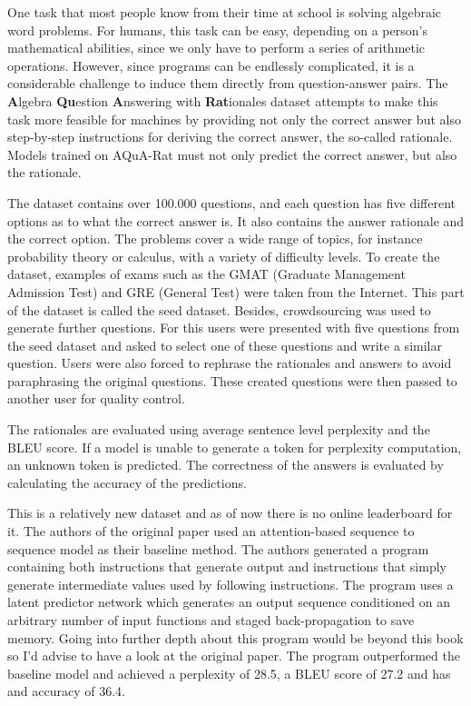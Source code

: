 \documentclass[]{krantz}
\begin{document}
One task that most people know from their time at school is solving algebraic word problems. For humans, this task can be easy, depending on a person's mathematical abilities, since we only have to perform a series of arithmetic operations. However, since programs can be endlessly complicated, it is a considerable challenge to induce them directly from question-answer pairs. The \textbf{A}lgebra \textbf{Qu}estion \textbf{A}nswering with \textbf{Rat}ionales dataset attempts to make this task more feasible for machines by providing not only the correct answer but also step-by-step instructions for deriving the correct answer, the so-called rationale. Models trained on AQuA-Rat must not only predict the correct answer, but also the rationale.

The dataset contains over 100.000 questions, and each question has five different options as to what the correct answer is. It also contains the answer rationale and the correct option. The problems cover a wide range of topics, for instance probability theory or calculus, with a variety of difficulty levels. To create the dataset, examples of exams such as the GMAT (Graduate Management Admission Test) and GRE (General Test) were taken from the Internet. This part of the dataset is called the seed dataset.
Besides, crowdsourcing was used to generate further questions. For this users were presented with five questions from the seed dataset and asked to select one of these questions and write a similar question. Users were also forced to rephrase the rationales and answers to avoid paraphrasing the original questions.
These created questions were then passed to another user for quality control.

The rationales are evaluated using average sentence level perplexity and the BLEU score. If a model is unable to generate a token for perplexity computation, an unknown token is predicted. The correctness of the answers is evaluated by calculating the accuracy of the predictions.

This is a relatively new dataset and as of now there is no online leaderboard for it. The authors of the original paper used an attention-based sequence to sequence model as their baseline method. The authors generated a program containing both instructions that generate output and instructions that simply generate intermediate values used by following instructions. The program uses a latent predictor network which generates an output sequence conditioned on an arbitrary number of input functions and staged back-propagation to save memory. Going into further depth about this program would be beyond this book so I'd advise to have a look at the original paper.
The program outperformed the baseline model and achieved a perplexity of 28.5, a BLEU score of 27.2 and has and accuracy of 36.4. \citep{ling2017program}
\end{document}
